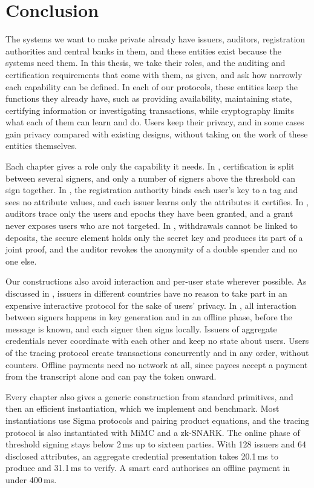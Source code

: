 \chapter{Conclusion}\label{chap:conclusion}

The systems we want to make private already have issuers, auditors,
registration authorities and central banks in them, and these entities exist
because the systems need them. In this thesis, we take their roles, and the
auditing and certification requirements that come with them, as given, and ask
how narrowly each capability can be defined. In each of our protocols, these
entities keep the functions they already have, such as providing availability,
maintaining state, certifying information or investigating transactions, while
cryptography limits what each of them can learn and do.  Users keep their
privacy, and in some cases gain privacy compared with existing designs, without
taking on the work of these entities themselves.

Each chapter gives a role only the capability it needs. In ,
certification is split between several signers, and only a number of signers
above the threshold can sign together. In , the
registration authority binds each user's key to a tag and sees no attribute
values, and each issuer learns only the attributes it certifies. In
, auditors trace only the users and epochs they have been
granted, and a grant never exposes users who are not targeted. In
, withdrawals cannot be linked to deposits, the
secure element holds only the secret key and produces its part of a joint
proof, and the auditor revokes the anonymity of a double spender and no one
else.

Our constructions also avoid interaction and per-user state wherever possible.
As discussed in , issuers in different countries have
no reason to take part in an expensive interactive protocol for the sake of
users' privacy. In , all interaction between signers happens in
key generation and in an offline phase, before the message is known, and each
signer then signs locally. Issuers of aggregate credentials never coordinate
with each other and keep no state about users. Users of the tracing protocol
create transactions concurrently and in any order, without counters. Offline
payments need no network at all, since payees accept a payment from the
transcript alone and can pay the token onward.

Every chapter also gives a generic construction from standard primitives, and
then an efficient instantiation, which we implement and benchmark. Most
instantiations use Sigma protocols and pairing product equations, and the
tracing protocol is also instantiated with MiMC and a zk-SNARK. The online
phase of threshold signing stays below 2\,ms up to sixteen parties. With 128
issuers and 64 disclosed attributes, an aggregate credential presentation takes
20.1\,ms to produce and 31.1\,ms to verify. A smart card authorises an offline
payment in under 400\,ms.

